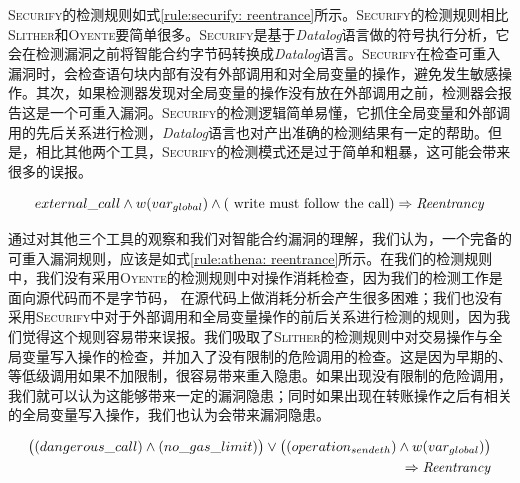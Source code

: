 \textsc{Securify}的检测规则如式\ref{rule:securify: reentrance}所示。\textsc{Securify}的检测规则相比\textsc{Slither}和\textsc{Oyente}要简单很多。\textsc{Securify}是基于\emph{Datalog}语言做的符号执行分析，它会在检测漏洞之前将智能合约字节码转换成\emph{Datalog}语言。\textsc{Securify}在检查可重入漏洞时，会检查语句块内部有没有外部调用和对全局变量的操作，避免发生敏感操作。其次，如果检测器发现对全局变量的操作没有放在外部调用之前，检测器会报告这是一个可重入漏洞。\textsc{Securify}的检测逻辑简单易懂，它抓住全局变量和外部调用的先后关系进行检测，\emph{Datalog}语言也对产出准确的检测结果有一定的帮助。但是，相比其他两个工具，\textsc{Securify}的检测模式还是过于简单和粗暴，这可能会带来很多的误报。
\begin{mdframed}[
	linewidth = 1pt,
	innertopmargin = -5pt,
	innerbottommargin = 3pt,
	outerlinewidth = 1pt
	]
    \small
	\begin{equation} \label{rule:securify: reentrance}
    external\_call \wedge w(var_{global}) \wedge (\text{ write must follow the call})  \Rightarrow \text{\emph{Reentrancy}}
	\end{equation}
\end{mdframed}
通过对其他三个工具的观察和我们对智能合约漏洞的理解，我们认为，一个完备的可重入漏洞规则，应该是如式\ref{rule:athena: reentrance}所示。在我们的检测规则中，我们没有采用\textsc{Oyente}的检测规则中对操作消耗检查，因为我们的检测工作是面向源代码而不是字节码， 在源代码上做消耗分析会产生很多困难；我们也没有采用\textsc{Securify}中对于外部调用和全局变量操作的前后关系进行检测的规则，因为我们觉得这个规则容易带来误报。我们吸取了\textsc{Slither}的检测规则中对交易操作与全局变量写入操作的检查，并加入了没有限制的危险调用的检查。这是因为早期的、等低级调用如果不加限制，很容易带来重入隐患。如果出现没有限制的危险调用，我们就可以认为这能够带来一定的漏洞隐患；同时如果出现在转账操作之后有相关的全局变量写入操作，我们也认为会带来漏洞隐患。
\begin{mdframed}[
	linewidth = 1pt,
	innertopmargin = -10pt,
	innerbottommargin = 3pt,
	outerlinewidth = 1pt
	]
    \small
	\begin{equation} \label{rule:athena: reentrance}
    \begin{split}
       \big ((dangerous\_call) \wedge (no\_gas\_limit)\big ) \vee \big ((operation_{sendeth}) \wedge w(var_{global})\big ) \\
       \Rightarrow \text{\emph{Reentrancy}}
    \end{split}
	\end{equation}
\end{mdframed}


